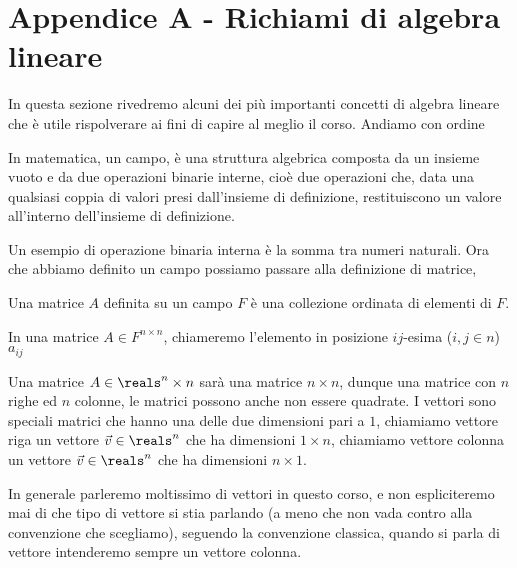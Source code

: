 \section{Appendice A - Richiami di algebra lineare}
\label{sec:algebra}
In questa sezione rivedremo alcuni dei più importanti concetti di algebra lineare che è utile rispolverare ai fini di capire al meglio il corso.
Andiamo con ordine

\begin{definition}
    In matematica, un campo, è una struttura algebrica composta da un insieme vuoto e da due operazioni binarie interne, cioè due operazioni che, data una qualsiasi coppia di valori presi dall'insieme di definizione, restituiscono un valore all'interno dell'insieme di definizione.
\end{definition}
Un esempio di operazione binaria interna è la somma tra numeri naturali. Ora che abbiamo definito un campo possiamo passare alla definizione di matrice,
\begin{definition}
    Una matrice $A$ definita su un campo $F$ è una collezione ordinata di elementi di $F$.

    In una matrice $A \in F^{n \times n}$, chiameremo l'elemento in posizione $ij$-esima ($i, j \in n$) $a_{ij}$
\end{definition}
Una matrice $A \in \reals^n \times n$ sarà una matrice $n \times n$, dunque una matrice con $n$ righe ed $n$ colonne, le matrici possono anche non essere quadrate. I vettori sono speciali matrici che hanno una delle due dimensioni pari a $1$, chiamiamo vettore riga un vettore $\vec{v} \in \reals^n$ che ha dimensioni $1 \times n$, chiamiamo vettore colonna un vettore $\vec{v} \in \reals^n$ che ha dimensioni $n \times 1$.

In generale parleremo moltissimo di vettori in questo corso, e non espliciteremo mai di che tipo di vettore si stia parlando (a meno che non vada contro alla convenzione che scegliamo), seguendo la convenzione classica, quando si parla di vettore intenderemo sempre un vettore colonna.

